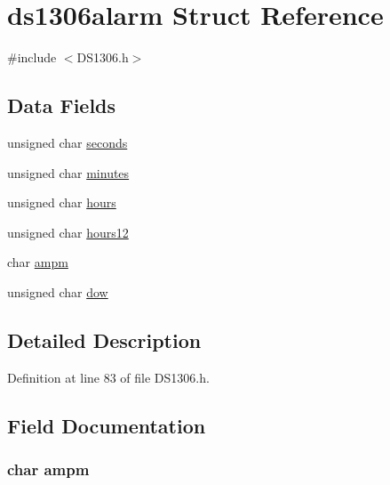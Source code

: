 \hypertarget{structds1306alarm}{\section{ds1306alarm Struct Reference}
\label{structds1306alarm}
}


{\ttfamily \#include $<$D\-S1306.\-h$>$}

\subsection*{Data Fields}
\begin{DoxyCompactItemize}
\item 
unsigned char \hyperlink{structds1306alarm_a173027d8c297c3e800a19ec32217953e}{seconds}
\item 
unsigned char \hyperlink{structds1306alarm_acf4ceb0d1cb80a37559ed7fd414cd389}{minutes}
\item 
unsigned char \hyperlink{structds1306alarm_ad6bf06b59feb7f83117fd66cd2f365ad}{hours}
\item 
unsigned char \hyperlink{structds1306alarm_ab51bff648a0be672b522ac48e8da69fc}{hours12}
\item 
char \hyperlink{structds1306alarm_ab107d7a2945b7954fcf45a0e3c129f03}{ampm}
\item 
unsigned char \hyperlink{structds1306alarm_a75aeb148620066973ea11791d72dc7cc}{dow}
\end{DoxyCompactItemize}


\subsection{Detailed Description}


Definition at line 83 of file D\-S1306.\-h.



\subsection{Field Documentation}
\hypertarget{structds1306alarm_ab107d7a2945b7954fcf45a0e3c129f03}{
\subsubsection[{ampm}]{\setlength{\rightskip}{0pt plus 5cm}char ampm}}\label{structds1306alarm_ab107d7a2945b7954fcf45a0e3c129f03}


